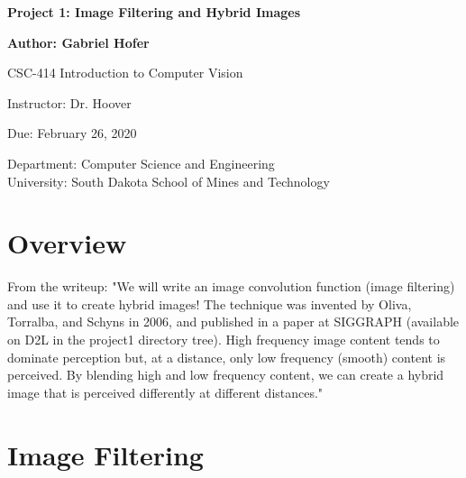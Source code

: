 \documentclass[12pt]{article}
\begin{document}
\begin{titlepage}
   \begin{center}
       \vspace*{1cm}
       \large
       \textbf{Project 1: Image Filtering and Hybrid Images}
       \normalsize

       \vspace{0.5cm}

       \textbf{Author: Gabriel Hofer}

       \vspace{0.5cm}

       CSC-414 Introduction to Computer Vision

       \vspace{0.5cm}

       Instructor: Dr. Hoover

       \vspace{0.5cm}

       Due: February 26, 2020

       \vfill

       Department: Computer Science and Engineering\\
       University: South Dakota School of Mines and Technology\\
   \end{center}
\end{titlepage}


\newpage
\section{Overview}
From the writeup: 
"We will write an image convolution function (image filtering) and use it to create hybrid
images! The technique was invented by Oliva, Torralba, and Schyns in 2006, and published
in a paper at SIGGRAPH (available on D2L in the project1 directory tree). High frequency
image content tends to dominate perception but, at a distance, only low frequency (smooth)
content is perceived. By blending high and low frequency content, we can create a hybrid
image that is perceived differently at different distances."

\section{Image Filtering}
\end{document}
